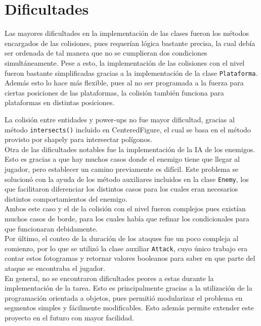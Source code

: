 \documentclass[letterpaper,11pt]{article} %
\begin{document}
\section{Dificultades}
	Las mayores dificultades en la implementación de las clases fueron los métodos encargados de las colisiones, pues requerían lógica bastante precisa, la cual debía ser ordenada de tal manera que no se cumplieran dos condiciones simultáneamente. Pese a esto, la implementación de las colisiones con el nivel fueron bastante simplificadas gracias a la implementación de la clase \verb!Plataforma!. Además esto lo hace más flexible, pues al no ser programada a la fuerza para ciertas posiciones de las plataformas, la colisión también funciona para plataformas en distintas posiciones\footnotemark.\\
	
	La colisión entre entidades y power-ups no fue mayor dificultad, gracias al método \verb+intersects()+ incluido en CenteredFigure, el cual se basa en el método provisto por shapely para intersectar polígonos.\\

	Otra de las dificultades notables fue la implementación de la IA de los enemigos. Esto es gracias a que hay muchos casos donde el enemigo tiene que llegar al jugador, pero establecer un camino previamente es difícil. Este problema se solucionó con la ayuda de los método auxiliares incluidos en la clase \verb!Enemy!, los que facilitaron diferenciar los distintos casos para los cuales eran necesarios distintos comportamientos del enemigo.\\

	Ambos este caso y el de la colisión con el nivel fueron complejos pues existían muchos casos de borde, para los cuales había que refinar los condicionales para que funcionaran debidamente.\\

	Por último, el conteo de la duración de los ataques fue un poco compleja al comienzo, por lo que se utilizó la clase auxiliar \verb!Attack!, cuyo único trabajo era contar estos fotogramas y retornar valores booleanos para saber en que parte del ataque se encontraba el jugador.\\

	En general, no se encontraron dificultades peores a estas durante la implementación de la tarea. Esto es principalmente gracias a la utilización de la programación orientada a objetos, pues permitió modularizar el problema en segmentos simples y fácilmente modificables. Esto además permite extender este proyecto en el futuro con mayor facilidad.
\end{document}

